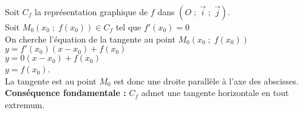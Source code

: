 Soit $C_f$ la représentation graphique de $f$ dans $\left( O \; ; \; \overrightarrow{i} \; ; \; \overrightarrow{j} \right)$. \\

Soit $M_0\left(x_0\; ; \; f(x_0)\right) \in C_f$ tel que $f'(x_0) = 0$ \\

On cherche l'équation de la tangente au point $M_0\left(x_0 \; ; \; f(x_0)\right)$\\

$y = f'(x_0)\left(x-x_0\right) + f(x_0)$ \\
$y = 0\left(x-x_0\right) + f(x_0)$ \\
$y = f(x_0)$. \\

La tangente est au point $M_0$ est donc une droite parallèle à l'axe des abscisses. \\

\textbf{Conséquence fondamentale :} $C_f$ admet une tangente horizontale en tout extremum. \\

